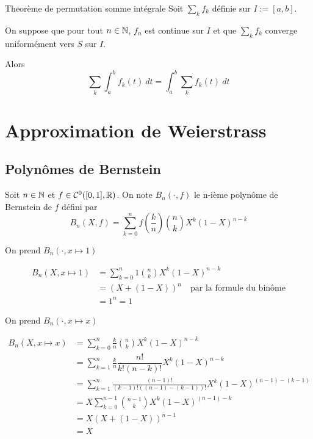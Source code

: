 \documentclass[a4paper,12pt]{article}
\begin{document}
\begin{theoreme}{Theorème de permutation somme intégrale}{}
    Soit $\sum_k f_k$ définie sur $I := [a, b]$.

    On suppose que pour tout $n \in \mathbb{N}$, $f_n$ est continue sur $I$ et que $\sum_k f_k$ converge uniformément vers $S$ sur $I$.

    Alors
    $$
    \sum_k \int_a^b f_k(t) \ dt = \int_a^b \sum_k f_k(t) \ dt
    $$
\end{theoreme}

\clearpage

\section{Approximation de Weierstrass}

\subsection{Polynômes de Bernstein}

\begin{definition}
    Soit $n \in \mathbb{N}$ et $f \in \mathcal{C}^0([0, 1], \mathbb{R})$. On note $B_n(\cdot, f)$ le
    n-ième polynôme de Bernstein de $f$ défini par
    $$
    B_n(X, f) = \sum_{k=0}^n f\left(\frac{k}{n}\right) \binom{n}{k} X^k (1-X)^{n-k}
    $$ 
\end{definition}

\begin{exemple}
    On prend $B_n(\cdot, x \mapsto 1)$
    
    \begin{align*}
        B_n(X, x \mapsto 1) &= \sum\limits_{k=0}^n 1 \binom{n}{k} X^k (1-X)^{n-k} \\
        &= (X + (1-X))^n \quad \text{par la formule du binôme}\\
        &= 1^n = 1
    \end{align*}
\end{exemple}

\begin{exemple}
    On prend $B_n(\cdot, x \mapsto x)$

    \begin{align*}  
        B_n(X, x \mapsto x) &= \sum\limits_{k=0}^n \frac{k}{n} \binom{n}{k} X^k (1-X)^{n-k} \\
        &= \sum\limits_{k=1}^n \frac{k}{n} \dfrac{n!}{k!(n-k)!} X^k (1-X)^{n-k} \\
        &= \sum\limits_{k=1}^n \frac{(n-1)!}{(k-1)!((n-1)-(k-1))!} X^k (1-X)^{(n-1)-(k-1)} \\
        &= X \sum\limits_{k=0}^{n-1} \binom{n-1}{k} X^k (1-X)^{(n-1)-k} \\
        &= X (X + (1-X))^{n-1} \\
        &= X
    \end{align*}
\end{exemple}
\end{document}
